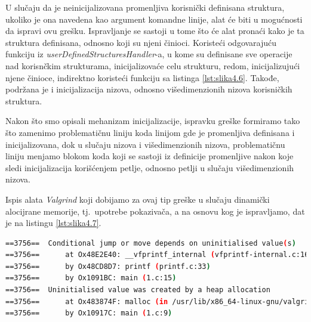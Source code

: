 \documentclass[12pt,oneside]{memoir}
\theoremstyle{plain}
\theoremstyle{definition}
\begin{document}
U slučaju da je neinicijalizovana promenljiva korisnički definisana struktura, ukoliko je ona navedena kao argument komandne linije, alat će biti u mogućnosti da ispravi ovu grešku. Ispravljanje se sastoji u tome što će alat pronaći kako je ta struktura definisana, odnosno koji su njeni činioci. Koristeći odgovarajuću funkciju iz \textit{userDefinedStructuresHandler}-a, u kome su definisane sve operacije nad korisnčkim strukturama, inicijalizovaće celu strukturu, redom, inicijalizujući njene činioce, indirektno koristeći funkciju sa listinga \ref{lst:slika4.6}. Takođe, podržana je i inicijalizacija nizova, odnosno višedimenzionih nizova korisničkih struktura. 

Nakon što smo opisali mehanizam inicijalizacije, ispravku greške formiramo tako što zamenimo problematičnu liniju koda linijom gde je promenljiva definisana i inicijalizovana, dok u slučaju nizova i višedimenzionih nizova, problematičnu liniju menjamo blokom koda koji se sastoji iz definicije promenljive nakon koje sledi inicijalizacija korišćenjem petlje, odnosno petlji u slučaju višedimenzionih nizova. 

Ispis alata \textit{Valgrind} koji dobijamo za ovaj tip greške u slučaju dinamički alocijrane memorije, tj.~upotrebe pokazivača, a na osnovu kog je ispravljamo, dat je na listingu \ref{lst:slika4.7}.


\begin{lstlisting}[style=terminal,caption={Ispis greške korišćenja dinamiči alocirane neinicijalizovane promenljive (pokazivača)}, label={lst:slika4.7},language={bash}]   
==3756==  Conditional jump or move depends on uninitialised value(s)
==3756==      at Ox48E2E40: __vfprintf_internal (vfprintf-internal.c:1644)
==3756==      by Ox48CD8D7: printf (printf.c:33)
==3756==      by Ox1091BC: main (1.c:15)
==3756==  Uninitialised value was created by a heap allocation
==3756==      at Ox483874F: malloc (in /usr/lib/x86_64-linux-gnu/valgrind/vgpreload_memcheck-amd64-linux.so) 
==3756==      by Ox10917C: main (1.c:9)
\end{lstlisting}
\end{document}
